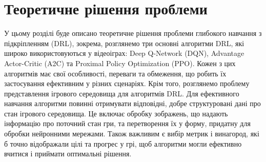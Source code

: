 

 \setcounter{chapter}{1}
 \chapter{Теоретичне рішення проблеми}

 
 У цьому розділі буде описано теоретичне рішення проблеми глибокого навчання з 
 підкріпленням (DRL), зокрема, розглянемо три основні алгоритми DRL, які широко 
 використовуються у відеоіграх: Deep Q-Network (DQN), Advantage Actor-Critic (A2C) 
 та Proximal Policy Optimization (PPO). Кожен з цих алгоритмів має свої особливості, 
 переваги та обмеження, що робить їх застосування ефективним у різних сценаріях.
 Крім того, розглянемо проблему представлення ігрового середовища 
 для алгоритмів DRL. Для ефек\-тив\-ного навчання алгоритми повинні отримувати 
 відповідні, добре структуровані дані про стан ігрового середовища. Це включає 
 обробку зображень, що надають інформацію про поточний стан гри, та перетворення 
 їх у форму, придатну для обробки нейронними мережами. Також важливим є вибір метрик 
 і винагород, які б точно відображали цілі та прогрес у грі, щоб алгоритми могли 
 ефективно вчитися і приймати оптимальні рішення.


